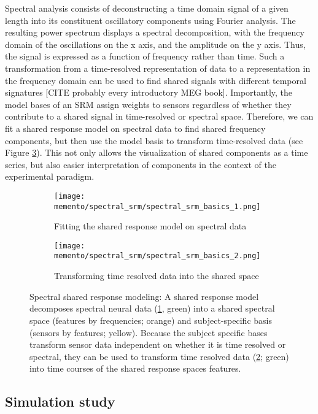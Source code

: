Spectral analysis consists of deconstructing a time domain signal of a given length into its constituent oscillatory components using Fourier analysis.
The resulting power spectrum displays a spectral decomposition, with the frequency domain of the oscillations on the x axis, and the amplitude on the y axis.
Thus, the signal is expressed as a function of frequency rather than time.
Such a transformation from a time-resolved representation of data to a representation in the frequency domain can be used to find shared signals with different temporal signatures [CITE probably every introductory MEG book].
Importantly, the model bases of an \gls{SRM} assign weights to sensors regardless of whether they contribute to a shared signal in time-resolved or spectral space.
Therefore, we can fit a shared response model on spectral data to find shared frequency components, but then use the model basis to transform time-resolved data (see Figure \ref{fig:spectral-srm}).
This not only allows the visualization of shared components as a time series, but also easier interpretation of components in the context of the experimental paradigm.


\begin{figure}
	\centering
	\begin{subfigure}{0.9\textwidth}
		\texttt{[image: memento/spectral\_srm/spectral\_srm\_basics\_1.png]}
		\caption{Fitting the shared response model on spectral data}
		\label{fig:spectral-srm1}
	\end{subfigure}
	\begin{subfigure}{0.9\textwidth}
		\texttt{[image: memento/spectral\_srm/spectral\_srm\_basics\_2.png]}
		\caption{Transforming time resolved data into the shared space}
		\label{fig:spectral-srm2}
	\end{subfigure}
	\caption[Spectral shared response modeling]{Spectral shared response modeling: A shared response model decomposes spectral neural data (\ref{fig:spectral-srm1}, green) into a shared spectral space (features by frequencies; orange) and subject-specific basis (sensors by features; yellow). Because the subject specific bases transform sensor data independent on whether it is time resolved or spectral, they can be used to transform time resolved data (\ref{fig:spectral-srm2}; green) into time courses of the shared response spaces features.}
	\label{fig:spectral-srm}
\end{figure}

\subsection{Simulation study}


